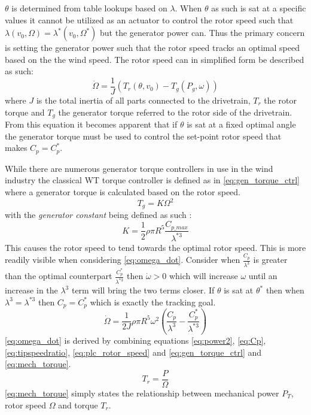 $ \theta $ is determined from table lookups based on $ \lambda $. When $ \theta $ as such is sat at a specific values it cannot be utilized as an actuator to control the rotor speed such that $ \lambda(v_0, \Omega) = \lambda^*(v_0, \Omega^*) $ but the generator power can. Thus the primary concern is setting the generator power such that the rotor speed tracks an optimal speed based on the the wind speed. The rotor speed can in simplified form be described as such:
\begin{equation}\label{eq:plc_rotor_speed}
	\dot{\Omega} = \dfrac{1}{J} \left( T_r(\theta, v_0) - T_g(P_g, \omega) \right)
\end{equation}
where $ J $ is the total inertia of all parts connected to the drivetrain, $ T_r $ the rotor torque and $ T_g $ the generator torque referred to the rotor side of the drivetrain. From this equation it becomes apparent that if $ \theta $ is sat at a fixed optimal angle the generator torque must be used to control the set-point rotor speed that makes $ C_p = C_p^* $.

While there are numerous generator torque controllers in use in the wind industry the classical WT torque controller is defined as in \cref{eq:gen_torque_ctrl} where a generator torque is calculated based on the rotor speed.
\begin{equation}\label{eq:gen_torque_ctrl}
	T_g = K \Omega^2
\end{equation}
with the \textit{generator constant} being defined as such \cite{Pao2009}:
\begin{equation}\label{eq:gen_torque_const}
	K = \dfrac{1}{2} \rho \pi R^5 \dfrac{C_{p\_max}}{\lambda^{*3}}
\end{equation}
This causes the rotor speed to tend towards the optimal rotor speed. This is more readily visible when considering \cref{eq:omega_dot}. Consider when $ \frac{C_p}{\lambda^3} $ is greater than the optimal counterpart $ \frac{C_p^*}{\lambda^{*3}} $ then $ \dot{\omega} > 0 $ which will increase $ \omega $ until an increase in the $ \lambda^3 $ term will bring the two terms closer. If $ \theta $ is sat at $ \theta^* $ then when $ \lambda^3 = \lambda^{*3} $ then $ C_p = C_p^* $ which is exactly the tracking goal.
\begin{equation}\label{eq:omega_dot}
	\dot{\Omega} = \dfrac{1}{2 J} \rho \pi R^5 \omega^2 \left( \dfrac{C_p}{\lambda^3} - \dfrac{C_p^*}{\lambda^{*3}} \right)
\end{equation}
\cref{eq:omega_dot} is derived by combining equations \cref{eq:power2}, \cref{eq:Cp}, \cref{eq:tipspeedratio}, \cref{eq:plc_rotor_speed} and \cref{eq:gen_torque_ctrl} and \cref{eq:mech_torque}.
\begin{equation}\label{eq:mech_torque}
	T_r = \dfrac{P}{\Omega}
\end{equation}
\cref{eq:mech_torque} simply states the relationship between mechanical power $ P_T $, rotor speed $ \Omega $ and torque $ T_r $.

